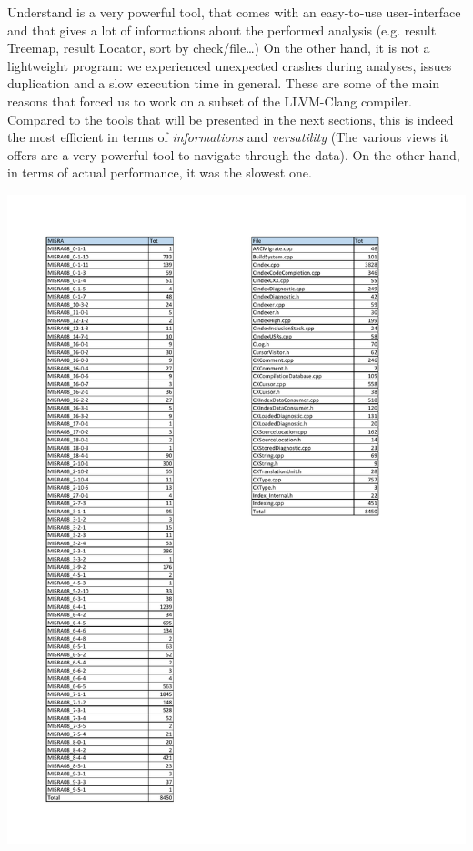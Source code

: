 Understand is a very powerful tool, that comes with an easy-to-use user-interface and that gives a lot of informations about the performed analysis (e.g. result Treemap, result Locator, sort by check/file\dots)
On the other hand, it is not a lightweight program: we experienced unexpected crashes during analyses, issues duplication and a slow execution time in general. These are some of the main reasons that forced us to work on a subset of the LLVM-Clang compiler.\newline
Compared to the tools that will be presented in the next sections, this is indeed the most efficient in terms of \textsl{informations} and \textsl{versatility} (The various views it offers are a very powerful tool to navigate through the data). On the other hand, in terms of actual performance, it was the slowest one.

\pagebreak

\begin{minipage}{\linewidth}
	\includegraphics[width=\textwidth]{pdf/Misra_Summary.pdf}
\end{minipage}

